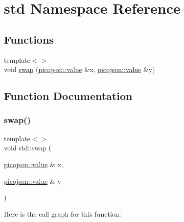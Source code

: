 \hypertarget{namespacestd}{}\section{std Namespace Reference}
\label{namespacestd}
\subsection*{Functions}
\begin{DoxyCompactItemize}
\item 
{\footnotesize template$<$$>$ }\\void \hyperlink{namespacestd_abb7e41c7063536ff6eeee4bb5f66de6c}{swap} (\hyperlink{classpicojson_1_1value}{picojson\+::value} \&x, \hyperlink{classpicojson_1_1value}{picojson\+::value} \&y)
\end{DoxyCompactItemize}


\subsection{Function Documentation}
\hypertarget{namespacestd_abb7e41c7063536ff6eeee4bb5f66de6c}{}\label{namespacestd_abb7e41c7063536ff6eeee4bb5f66de6c} 
\subsubsection{\texorpdfstring{swap()}{swap()}}
{\footnotesize\ttfamily template$<$$>$ \\
void std\+::swap (\begin{DoxyParamCaption}\item[{\hyperlink{classpicojson_1_1value}{picojson\+::value} \&}]{x,  }\item[{\hyperlink{classpicojson_1_1value}{picojson\+::value} \&}]{y }\end{DoxyParamCaption})\hspace{0.3cm}{\ttfamily [inline]}}

Here is the call graph for this function\+:

